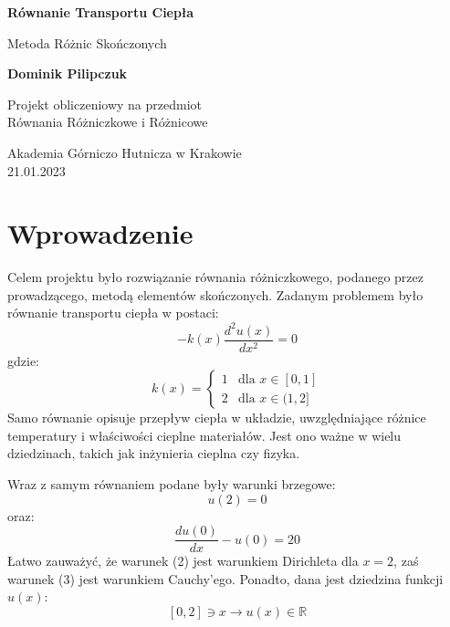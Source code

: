 \documentclass[12pt]{article}
\begin{document}
\begin{titlepage}
	\begin{center}
		\vspace*{1cm}
 
		{\huge \textbf{Równanie Transportu Ciepła}}
 
		\vspace{0.5cm}
		 Metoda Różnic Skończonych
			 
		\vspace{1.5cm}
 
		{\huge \textbf{Dominik Pilipczuk}}
 
		\vfill
			 
		Projekt obliczeniowy na przedmiot\\
		Równania Różniczkowe i Różnicowe
			 
		\vspace{0.8cm}
	
			 
		Akademia Górniczo Hutnicza w Krakowie\\
		21.01.2023
			 
	\end{center}
\end{titlepage}


\section{Wprowadzenie}
Celem projektu było rozwiązanie równania różniczkowego, podanego przez prowadzącego, metodą
 elementów skończonych. Zadanym problemem było równanie transportu ciepła w postaci:
\begin{equation}
	-k(x) \frac{d^2 u(x)}{dx^2} = 0
\end{equation}
gdzie:
\[
	k(x)=\begin{cases}
		1 & \text{dla $x \in [0,1]$}\\
		2 & \text{dla $x \in (1,2]$}
	  \end{cases}
\]
Samo równanie opisuje przepływ ciepła w układzie,
 uwzględniające różnice temperatury i właściwości cieplne materiałów. 
 Jest ono ważne w wielu dziedzinach, takich jak inżynieria cieplna czy fizyka.

\noindent Wraz z samym równaniem podane były warunki brzegowe:
\begin{equation}
	u(2)=0 
\end{equation}
oraz:
\begin{equation}
	\frac{du(0)}{dx} - u(0) = 20
\end{equation}
\noindent Łatwo zauważyć, że warunek (2) jest warunkiem Dirichleta dla $x = 2$, 
zaś warunek (3) jest warunkiem Cauchy'ego. Ponadto, dana jest dziedzina funkcji $u(x)$:
\[
	[0, 2] \ni x \to u(x) \in \mathbb{R}
\]
\end{document}
